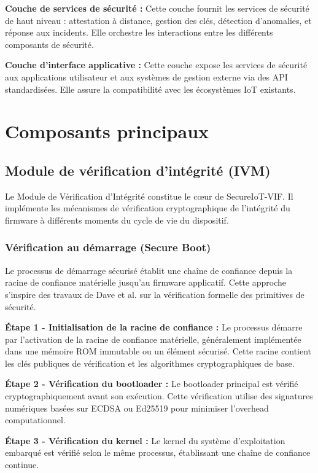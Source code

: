 \textbf{Couche de services de sécurité :} Cette couche fournit les services de sécurité de haut niveau : attestation à distance, gestion des clés, détection d'anomalies, et réponse aux incidents. Elle orchestre les interactions entre les différents composants de sécurité.

\textbf{Couche d'interface applicative :} Cette couche expose les services de sécurité aux applications utilisateur et aux systèmes de gestion externe via des API standardisées. Elle assure la compatibilité avec les écosystèmes IoT existants.

\section{Composants principaux}

\subsection{Module de vérification d'intégrité (IVM)}

Le Module de Vérification d'Intégrité constitue le cœur de SecureIoT-VIF. Il implémente les mécanismes de vérification cryptographique de l'intégrité du firmware à différents moments du cycle de vie du dispositif.

\subsubsection{Vérification au démarrage (Secure Boot)}

Le processus de démarrage sécurisé établit une chaîne de confiance depuis la racine de confiance matérielle jusqu'au firmware applicatif. Cette approche s'inspire des travaux de Dave et al. \cite{Dave2023FVCARE} sur la vérification formelle des primitives de sécurité.

\textbf{Étape 1 - Initialisation de la racine de confiance :} Le processus démarre par l'activation de la racine de confiance matérielle, généralement implémentée dans une mémoire ROM immutable ou un élément sécurisé. Cette racine contient les clés publiques de vérification et les algorithmes cryptographiques de base.

\textbf{Étape 2 - Vérification du bootloader :} Le bootloader principal est vérifié cryptographiquement avant son exécution. Cette vérification utilise des signatures numériques basées sur ECDSA ou Ed25519 pour minimiser l'overhead computationnel.

\textbf{Étape 3 - Vérification du kernel :} Le kernel du système d'exploitation embarqué est vérifié selon le même processus, établissant une chaîne de confiance continue.


